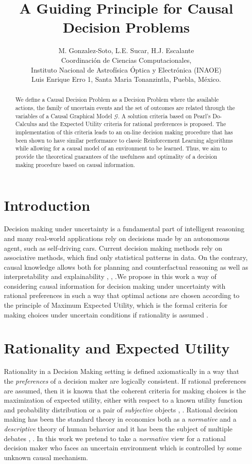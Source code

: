 \documentclass[letterpaper]{article} %
\title{A Guiding Principle for Causal Decision Problems}
\author{M. Gonzalez-Soto, L.E. Sucar, H.J. Escalante\\
Coordinaci\'on de Ciencias Computacionales,\\
Instituto Nacional de Astrof\'isica \'Optica y Electr\'onica (INAOE)\\
Luis Enrique Erro 1, Santa Maria Tonanzintla, Puebla, M\'exico.
}
\theoremstyle{plain}
\begin{document}
\maketitle
\begin{abstract}
We define a Causal Decision Problem as a Decision Problem where the available actions, the family of uncertain events and the set of outcomes are related through the variables of a Causal Graphical Model $\mathcal{G}$. A solution criteria based on Pearl's Do-Calculus and the Expected Utility criteria for rational preferences is proposed. The implementation of this criteria leads to an on-line decision making procedure that has been shown to have similar performance to classic Reinforcement Learning algorithms while allowing for a causal model of an environment to be learned. Thus, we aim to provide the theoretical guarantees of the usefulness and optimality of a decision making procedure based on causal information.
\end{abstract}

\section{Introduction}
Decision making under uncertainty is a fundamental part of intelligent reasoning \cite{lake2017building} and many real-world applications rely on decisions made by an autonomous agent, such as self-driving cars. Current decision making methods rely on associative methods, which find only statistical patterns in data. On the contrary, causal knowledge allows both for planning and counterfactual reasoning as well as interpretability and explainability \cite{spirtes2000causation}, \cite{woodward2005making}, \cite{pearl2018why}.We propose in this work a way of considering causal information for decision making under uncertainty with rational preferences in such a way that optimal actions are chosen according to the principle of Maximum Expected Utility, which is the formal criteria for making choices under uncertain conditions if rationality is assumed \cite{bernardo2000bayesian}.

\section{Rationality and Expected Utility}
Rationality in a Decision Making setting is defined axiomatically in a way that the \textit{preferences} of a decision maker are logically consistent. If rational preferences are assumed, then it is known that the coherent criteria for making choices is the maximization of expected utility, either with respect to a known utility function and probability distribution or a pair of \textit{subjective} objects \cite{bernardo2000bayesian}, \cite{gilboa2009decision}. Rational decision making has been the standard theory in economics both as a \textit{normative} and a \textit{descriptive} theory of human behavior and it has been the subject of multiple debates \cite{tversky1974judgment}, \cite{kahneman1982judgment}. In this work we pretend to take a \textit{normative} view for a rational decision maker who faces an uncertain environment which is controlled by some unknown causal mechanism.
\end{document}
